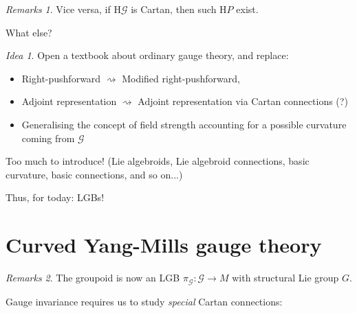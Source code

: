 \documentclass[
aspectratio=3218, 
10pt
]{beamer}
\theoremstyle{plain}
\theoremstyle{remark}
\newtheorem*{remark}{Remarks}
\newtheorem*{idea}{Idea}
\begin{document}
{\begin{frame}
\begin{remark}
Vice versa, if $\mathup{H}\mathcal{G}$ is Cartan, then such $\mathup{H}P$ exist.
\end{remark}
\end{frame}


\begin{frame}{What else?}
\begin{idea}
Open a textbook about ordinary gauge theory, and replace:
\begin{itemize}
	\item Right-pushforward $\rightsquigarrow$ Modified right-pushforward,
	\item Adjoint representation $\rightsquigarrow$ Adjoint representation via Cartan connections (?)
	\item Generalising the concept of field strength accounting for a possible curvature coming from $\mathcal{G}$
\end{itemize}
Too much to introduce! (Lie algebroids, Lie algebroid connections, basic curvature, basic connections, and so on...)

Thus, for today: LGBs!
\end{idea}
\end{frame}

\section{Curved Yang-Mills gauge theory}


\begin{frame}
\begin{remark}
The groupoid is now an LGB $\pi_{\mathcal{G}} \colon \mathcal{G} \to M$ with structural Lie group $G$.
\end{remark}

Gauge invariance requires us to study \emph{special} Cartan connections:

\pause


\end{frame}}
\end{document}

